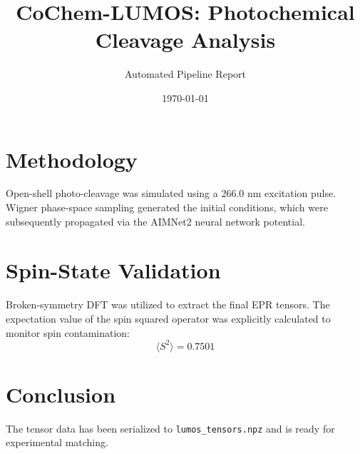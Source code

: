\documentclass[11pt, a4paper]{article}
\title{\textbf{CoChem-LUMOS: Photochemical Cleavage Analysis}}
\author{Automated Pipeline Report}
\date{\today}
\begin{document}
\maketitle

\section{Methodology}
Open-shell photo-cleavage was simulated using a 266.0 nm excitation pulse. 
Wigner phase-space sampling generated the initial conditions, which were subsequently propagated via the AIMNet2 neural network potential.

\section{Spin-State Validation}
Broken-symmetry DFT was utilized to extract the final EPR tensors. 
The expectation value of the spin squared operator was explicitly calculated to monitor spin contamination:
\begin{equation}
    \langle S^2 \rangle = 0.7501
\end{equation}

\section{Conclusion}
The tensor data has been serialized to \texttt{lumos\_tensors.npz} and is ready for experimental matching.
\end{document}
